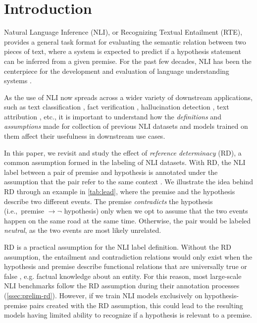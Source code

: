 
\section{Introduction}
Natural Language Inference (NLI), or Recognizing Textual Entailment (RTE), provides a general task format for evaluating the semantic relation between two pieces of text, where a system is expected to predict if a hypothesis statement can be inferred from a given premise.
For the past few decades, NLI has been the centerpiece for the development and evaluation of language understanding systems \cite{dagan2005pascal, bowman-etal-2015-large, williams-etal-2018-broad, nie-etal-2020-adversarial}.  

As the use of NLI now spreads across a wider variety of downstream applications, such as text classification \cite{yin-etal-2019-benchmarking}, fact verification \cite{schuster-etal-2021-get}, hallucination detection \cite{kryscinski-etal-2020-evaluating}, text attribution \cite{gao-etal-2023-rarr}, etc., 
it is important to understand how the \textit{definitions} and \textit{assumptions} made for collection of previous NLI datasets and models trained on them affect their usefulness in downstream use cases.



In this paper, we revisit and study the effect of \textit{reference determinacy} (RD), a common assumption formed in the labeling of NLI datasets.
With RD, the NLI label between a pair of premise and hypothesis is annotated under the assumption that the pair refer to the same context \cite{bowman-etal-2015-large}.
We illustrate the idea behind RD through an example in \autoref{tab:lead}, where the premise and the hypothesis describe two different events. 
The premise \textit{contradicts} the hypothesis (i.e.,\ premise $\rightarrow \neg$ hypothesis) only when we opt to assume that the two events happen on the same road at the same time. Otherwise, the pair would be labeled \textit{neutral}, as the two events are most likely unrelated. 

RD is a practical assumption for the NLI label definition. Without the RD assumption, the entailment and contradiction relations would only exist when the hypothesis and premise describe functional relations that are universally true or false \cite{ritter-etal-2008-contradiction}, e.g. factual knowledge about an entity. For this reason, most large-scale NLI benchmarks follow the RD assumption during their annotation processes (\cref{ssec:prelim-rd}). However, if we train NLI models exclusively on hypothesis-premise pairs created with the RD assumption, this could lead to the resulting models having limited ability to recognize if a hypothesis is relevant to a premise.

